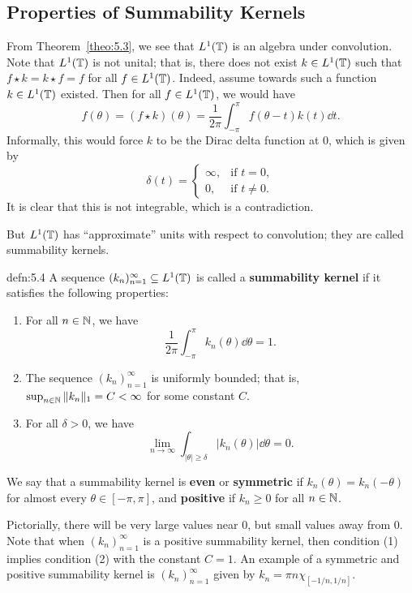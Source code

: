 \subsection{Properties of Summability Kernels} \label{subsec:5.2}
From Theorem~\ref{theo:5.3}, we see that $L^1(\mathbb{T})$ is an algebra under convolution. 
Note that $L^1(\mathbb{T})$ is not unital; that is, there does not exist $k \in L^1(\mathbb{T})$ 
such that $f \star k = k \star f = f$ for all $f \in L^1(\mathbb{T})$. Indeed, assume 
towards such a function $k \in L^1(\mathbb{T})$ existed. Then for all $f \in L^1(\mathbb{T})$, 
we would have 
\[ f(\theta) = (f \star k)(\theta) = \frac{1}{2\pi} \int_{-\pi}^\pi f(\theta - t)
k(t)\dd t. \] 
Informally, this would force $k$ to be the Dirac delta function at $0$, 
which is given by 
\[ \delta(t) = \begin{cases}
    \infty, & \text{if } t = 0, \\ 
    0, & \text{if } t \neq 0.
\end{cases} \] 
It is clear that this is not integrable, which is a contradiction.

But $L^1(\mathbb{T})$ has ``approximate'' units with respect to convolution; they are 
called summability kernels. 

\begin{defn}{defn:5.4}
    A sequence $(k_n)_{n=1}^\infty \subseteq L^1(\mathbb{T})$ is called a {\bf summability
    kernel} if it satisfies the following properties: 
    \begin{enumerate}[(1)]
        \item For all $n \in \mathbb{N}$, we have 
        \[ \frac{1}{2\pi} \int_{-\pi}^\pi k_n(\theta)\dd\theta = 1. \] 
        \item The sequence $(k_n)_{n=1}^\infty$ is uniformly bounded; that is, 
        $\sup_{n\in\mathbb{N}} \|k_n\|_1 = C < \infty$ for some constant $C$. 
        \item For all $\delta > 0$, we have 
        \[ \lim_{n\to\infty} \int_{|\theta|\geq\delta} |k_n(\theta)|\dd\theta = 0. \]
    \end{enumerate}
    We say that a summability kernel is {\bf even} or {\bf symmetric} if $k_n(\theta) 
    = k_n(-\theta)$ for almost every $\theta \in [-\pi, \pi]$, and {\bf positive} 
    if $k_n \geq 0$ for all $n \in \mathbb{N}$. 
\end{defn}

Pictorially, there will be very large values near $0$, but small values away from $0$. 
Note that when $(k_n)_{n=1}^\infty$ is a positive summability kernel, then 
condition (1) implies condition (2) with the constant $C = 1$. 
An example of a symmetric and positive summability kernel is $(k_n)_{n=1}^\infty$ given by 
$k_n = \pi n\chi_{[-1/n, 1/n]}$. 

